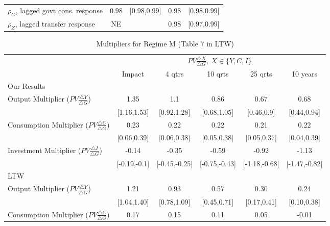 \documentclass[letterpaper,12pt]{article}%
\begin{document}
\begin{table}[H]
\begin{threeparttable}
\begin{tabular}{l c c  c c}
			\quad $\rho_G$, lagged govt cons. response & 0.98& [0.98,0.99] & 0.98& [0.98,0.99] \\
			\quad $\rho_Z$, lagged transfer response & NE&  & 0.98 & [0.97,0.99] \\
						\bottomrule   
		\end{tabular}
		\begin{tablenotes}
			\item %
		\end{tablenotes}
		\label{tab:RWMH_para}
	\end{threeparttable}
\end{table}

\begin{table}[H]
	\centering
	\begin{threeparttable}
		\caption{Multipliers for Regime M (Table 7 in LTW)}
		\begin{tabular}{l c c c c c}
			\toprule
			& \multicolumn{5}{c}{$PV \frac{\triangle X}{\triangle G} , \ X \in \{Y,C,I\}$}\\
			\cmidrule{2-6}
			& Impact & 4 qtrs & 10 qrts & 25 qrts & 10 years \\
			\midrule
		    Our Results&     &   &  &   &   \\
			\quad Output Multiplier ($PV \frac{ \triangle Y}{\triangle G}$)&  1.35 & 1.1 & 0.86 & 0.67 & 0.68 \\
			\quad &   [1.16,1.53] & [0.92,1.28] & [0.68,1.05] & [0.46,0.9] & [0.44,0.94] \\
			\quad Consumption Multiplier ($PV \frac{ \triangle C}{\triangle G}$)&  0.23 & 0.22 & 0.22 & 0.21 & 0.22\\
			\quad &   [0.06,0.39] & [0.06,0.38] & [0.05,0.38] & [0.05,0.37] & [0.04,0.39] \\
			\quad Investment Multiplier ($PV \frac{ \triangle I}{\triangle G}$)&  -0.14 & -0.35 & -0.59 & -0.92 & -1.13 \\
			\quad &   [-0.19,-0.1] & [-0.45,-0.25] & [-0.75,-0.43] & [-1.18,-0.68] & [-1.47,-0.82] \\
			LTW&     &   &  &   &   \\
			\quad Output Multiplier ($PV \frac{ \triangle Y}{\triangle G}$)&  1.21 & 0.93 & 0.57 & 0.30 & 0.24 \\
			\quad &   [1.04,1.40] & [0.78,1.09] & [0.45,0.71] & [0.17,0.41] & [0.10,0.38] \\
			\quad Consumption Multiplier ($PV \frac{ \triangle C}{\triangle G}$)&  0.17 & 0.15 & 0.11 & 0.05 & -0.01\\

\end{tabular}
\end{threeparttable}
\end{table}
\end{document}
